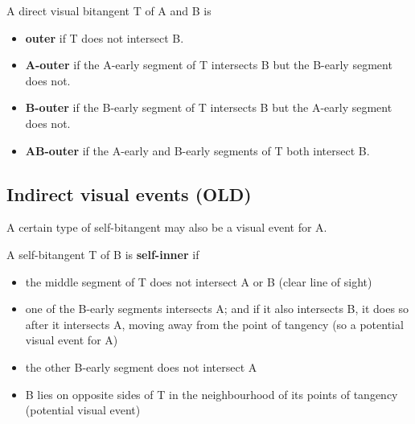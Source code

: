 \documentclass[12pt]{article}
\begin{document}
\begin{defn2}
A direct visual bitangent T of A and B is 
\begin{itemize}
\item {\bf outer} if T does not intersect B.
\item {\bf A-outer} if the A-early segment of T intersects B
      but the B-early segment does not.
\item {\bf B-outer} if the B-early segment of T intersects B
      but the A-early segment does not.
\item {\bf AB-outer} if the A-early and B-early segments of T both intersect B.
\end{itemize}
\end{defn2}



\clearpage

\subsection{Indirect visual events (OLD)}

A certain type of self-bitangent may also be a visual event for A.

\begin{defn2}
A self-bitangent T of B is {\bf self-inner} if
\begin{itemize}
\item the middle segment of T does not intersect A or B (clear line of sight)
\item one of the B-early segments intersects A;
      and if it also intersects B, it does so after it intersects A, moving away from
      the point of tangency (so a potential visual event for A)
\item the other B-early segment does not intersect A
\item B lies on opposite sides of T in the neighbourhood of its points of tangency
      (potential visual event)
\end{itemize}
\end{defn2}
\end{document}
